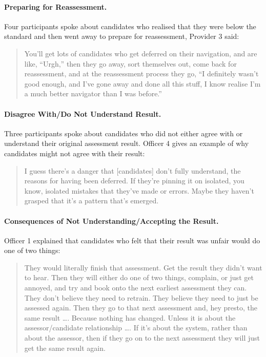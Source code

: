 \documentclass[
  12pt,
  a4paper,
]{book}
\begin{document}
\hypertarget{preparing-for-reassessment.}{%
\paragraph{Preparing for Reassessment.}\label{preparing-for-reassessment.}}

Four participants spoke about candidates who realised that they were below the standard and then went away to prepare for reassessment, Provider 3 said:

\begin{quote}
You'll get lots of candidates who get deferred on their navigation, and are like, ``Urgh,'' then they go away, sort themselves out, come back for reassessment, and at the reassessment process they go, ``I definitely wasn't good enough, and I've gone away and done all this stuff, I know realise I'm a much better navigator than I was before.''
\end{quote}

\hypertarget{disagree-withdo-not-understand-result.}{%
\paragraph{Disagree With/Do Not Understand Result.}\label{disagree-withdo-not-understand-result.}}

Three participants spoke about candidates who did not either agree with or understand their original assessment result. Officer 4 gives an example of why candidates might not agree with their result:

\begin{quote}
I guess there's a danger that {[}candidates{]} don't fully understand, the reasons for having been deferred. If they're pinning it on isolated, you know, isolated mistakes that they've made or errors. Maybe they haven't grasped that it's a pattern that's emerged.
\end{quote}

\hypertarget{consequences-of-not-understandingaccepting-the-result.}{%
\paragraph{Consequences of Not Understanding/Accepting the Result.}\label{consequences-of-not-understandingaccepting-the-result.}}

Officer 1 explained that candidates who felt that their result was unfair would do one of two things:

\begin{quote}
They would literally finish that assessment. Get the result they didn't want to hear. Then they will either do one of two things, complain, or just get annoyed, and try and book onto the next earliest assessment they can. They don't believe they need to retrain. They believe they need to just be assessed again. Then they go to that next assessment and, hey presto, the same result \ldots. Because nothing has changed. Unless it is about the assessor/candidate relationship \ldots. If it's about the system, rather than about the assessor, then if they go on to the next assessment they will just get the same result again.
\end{quote}
\end{document}
